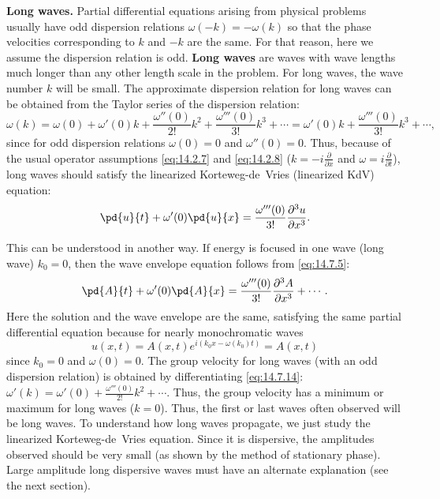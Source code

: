 \textbf{Long waves.}  Partial differential equations arising from physical problems usually have odd dispersion relations $\omega(-k) = -\omega(k)$ so that the phase velocities corresponding to $k$ and $-k$ are the same.  For that reason, here we assume the dispersion relation is odd.  \textbf{Long waves} are waves with wave lengths much longer than any other length scale in the problem.  For long waves, the wave number $k$ will be small.  The approximate dispersion relation for long waves can be obtained from the Taylor series of the dispersion relation:
\begin{equation}
\label{eq:14.7.14}
\omega(k) = \omega(0) + \omega'(0)k + \frac{\omega''(0)}{2!}k^2 + \frac{\omega'''(0)}{3!}k^3 + \cdots = \omega'(0)k + \frac{\omega'''(0)}{3!}k^3 + \cdots,
\end{equation}
since for odd dispersion relations $\omega(0) = 0$ and $\omega''(0) = 0$.  Thus, because of the usual operator assumptions \eqref{eq:14.2.7} and \eqref{eq:14.2.8} ($k = -i\frac{\partial}{\partial x}$ and $\omega = i\frac{\partial}{\partial t}$), long waves should satisfy the linearized Korteweg-de~Vries (linearized KdV) equation:
\[
\pd{u}{t} + \omega'(0)\pd{u}{x} = \frac{\omega'''(0)}{3!}\frac{\partial^3 u}{\partial x^3}.
\]

This can be understood in another way.  If energy is focused in one wave (long wave) $k_0 = 0$, then the wave envelope equation follows from \eqref{eq:14.7.5}:
\[
\pd{A}{t} + \omega'(0)\pd{A}{x} = \frac{\omega'''(0)}{3!}\frac{\partial^3 A}{\partial x^3} + \cdots.
\]
Here the solution and the wave envelope are the same, satisfying the same partial differential equation because for nearly monochromatic waves
\[
u(x,t) = A(x,t)e^{i(k_0 x - \omega(k_0)t)} = A(x,t)
\]
since $k_0 = 0$ and $\omega(0) = 0$.  The group velocity for long waves (with an odd dispersion relation) is obtained by differentiating \eqref{eq:14.7.14}: $\omega'(k) = \omega'(0) + \frac{\omega'''(0)}{2!}k^2 + \cdots$.  Thus, the group velocity has a minimum or maximum for long waves ($k = 0$).  Thus, the first or last waves often observed will be long waves.  To understand how long waves propagate, we just study the linearized Korteweg-de~Vries equation.  Since it is dispersive, the amplitudes observed should be very small (as shown by the method of stationary phase).  Large amplitude long dispersive waves must have an alternate explanation (see the next section).

